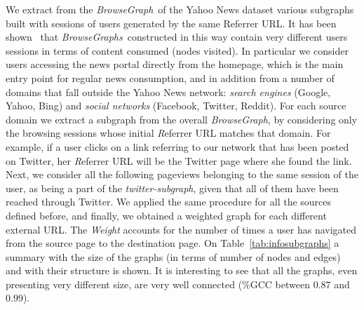 \documentclass{sig-alternate-2013}
\newcommand{\bgraph}{\textit{BrowseGraph}}
\newcommand{\bgraphs}{\textit{BrowseGraphs}}
\begin{document}
% 
We extract from the \bgraph\ of the Yahoo News dataset various subgraphs built with sessions of users generated by the same Referrer URL. It has been shown~\cite{TrevisiolRecSys14} that \bgraphs\ constructed in this way contain very different users sessions in terms of content consumed (nodes visited).
% 
In particular we consider users accessing the news portal directly from the homepage, which is the main entry point for regular news consumption, and in addition from a number of domains that fall outside the Yahoo News network: {\it search engines} (Google, Yahoo, Bing) and {\it social networks} (Facebook, Twitter, Reddit).
For each source domain we extract a subgraph from the overall \bgraph, by considering only the browsing sessions whose initial {\textit Referrer URL} matches that domain. For example, if a user clicks on a link referring to our network that has been posted on Twitter, her {\textit Referrer URL} will be the Twitter page where she found the link. Next, we consider all the following pageviews belonging to the same session of the user, as being a part of the {\it twitter-subgraph}, given that all of them have been reached through Twitter.
% 
We applied the same procedure for all the sources defined before, and finally, we obtained a weighted graph for each different external URL. The \textit{Weight} accounts for the number of times a user has navigated from the source page to the destination page. On Table~\ref{tab:infosubgraphs} a summary with the size of the graphs (in terms of number of nodes and edges) and with their structure is shown. It is interesting to see that all the graphs, even presenting very different size, are very well connected (\%GCC between $0.87$ and $0.99$).


\end{document}
